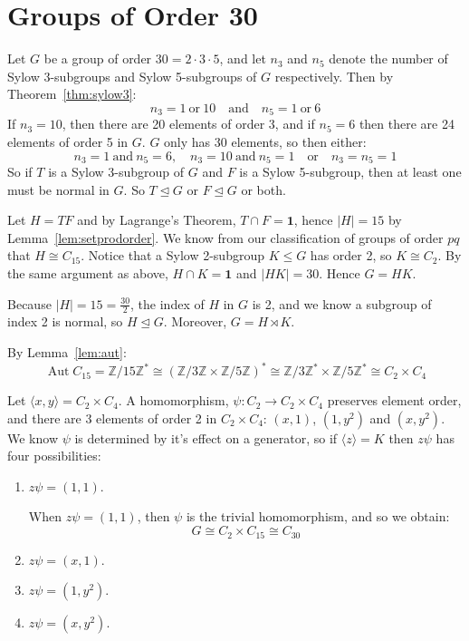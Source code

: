 \documentclass[a4paper, oneside, 12pt, final]{article}
\theoremstyle{definition}
\DeclareMathOperator{\Aut}{Aut}
\newcommand{\Z}{\mathbb{Z}}
\newcommand{\Zn}[1]{\Z/#1\Z}
\begin{document}

\section{Groups of Order 30}
Let \(G\) be a group of order \(30 = 2 \cdot 3 \cdot 5\), and let \(n_3\) and \(n_5\) denote the number of Sylow
3-subgroups and Sylow 5-subgroups of \(G\) respectively.
Then by Theorem~\ref{thm:sylow3}:
\[n_3 = 1 \ \text{or} \ 10 \quad \text{and} \quad n_5 = 1 \ \text{or} \ 6\]
If \(n_3 = 10\), then there are 20 elements of order 3, and if \(n_5 = 6\) then
there are 24 elements of order 5 in \(G\).
\(G\) only has 30 elements, so then either:
\[n_3 = 1 \ \text{and} \ n_5 = 6, \quad n_3 = 10 \ \text{and} \ n_5 = 1 \quad \text{or} \quad n_3 = n_5 = 1\]
So if \(T\) is a Sylow 3-subgroup of \(G\) and \(F\) is a Sylow 5-subgroup, then at least one must be normal in \(G\).
So \(T \unlhd G\) or \(F \unlhd G\) or both.

Let \(H = TF\) and by Lagrange's Theorem, \(T \cap F = \bm{1}\), hence \(|H| = 15\) by Lemma~\ref{lem:setprodorder}.
We know from our classification of groups of order \(pq\) that \(H \cong C_{15}\).
Notice that a Sylow 2-subgroup \(K \leqslant G\) has order 2, so \(K \cong C_2\).
By the same argument as above, \(H \cap K = \bm{1}\) and \(|HK| = 30\).
Hence \(G = HK\).

Because \(|H| = 15 = \frac{30}{2}\), the index of \(H\) in \(G\) is 2, and we know a subgroup of index 2 is normal, so \(H \unlhd G\).
Moreover, \(G = H \rtimes K\).

By Lemma~\ref{lem:aut}:
\[\Aut{C_{15}} = \Zn{15}^* \cong {(\Zn{3} \times \Zn{5})}^* \cong \Zn{3}^* \times \Zn{5}^* \cong C_2 \times C_4\]

Let \(\langle x, y \rangle = C_2 \times C_4\).
A homomorphism, \(\psi:C_2 \to C_2 \times C_4\) preserves element order, and there are 3 elements of order 2 in \(C_2
\times C_4\): \((x, 1)\), \((1, y^2)\) and \((x, y^2)\).
We know \(\psi\) is determined by it's effect on a generator, so if \(\langle z \rangle = K\) then \(z\psi\) has four
possibilities:

\begin{enumerate}
    \item \(z\psi = (1, 1)\).

        When \(z\psi = (1, 1)\), then \(\psi\) is the trivial homomorphism, and
        so we obtain:
        \[G \cong C_2 \times C_{15} \cong C_{30}\]

    \item \(z\psi = (x, 1)\).
    \item \(z\psi = (1, y^2)\).
    \item \(z\psi = (x, y^2)\).
\end{enumerate}
\end{document}
